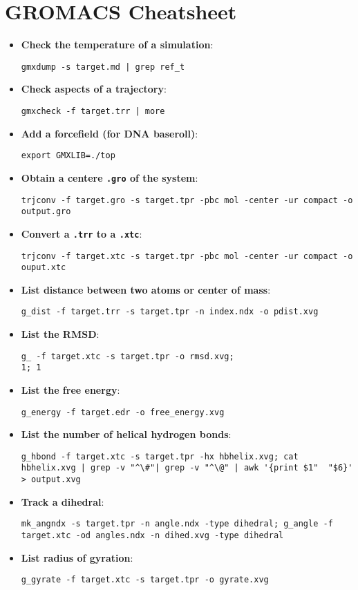 \documentclass[]{article}
\begin{document}
\newpage
\section*{GROMACS Cheatsheet}

\begin{itemize}
\item \textbf{Check the temperature of a simulation}: \begin{verbatim}gmxdump -s target.md | grep ref_t\end{verbatim}
\item \textbf{Check aspects of a trajectory}: \begin{verbatim}gmxcheck -f target.trr | more\end{verbatim}
\item \textbf{Add a forcefield (for DNA baseroll)}: \begin{verbatim}export GMXLIB=./top\end{verbatim}
\item \textbf{Obtain a centere \texttt{.gro} of the system}: \begin{verbatim}trjconv -f target.gro -s target.tpr -pbc mol -center -ur compact -o output.gro\end{verbatim}
\item \textbf{Convert a \texttt{.trr} to a \texttt{.xtc}}: \begin{verbatim}trjconv -f target.xtc -s target.tpr -pbc mol -center -ur compact -o ouput.xtc\end{verbatim}
\item \textbf{List distance between two atoms or center of mass}: \begin{verbatim}g_dist -f target.trr -s target.tpr -n index.ndx -o pdist.xvg\end{verbatim}
\item \textbf{List the RMSD}: \begin{verbatim}g_ -f target.xtc -s target.tpr -o rmsd.xvg;
1; 1\end{verbatim}
\item \textbf{List the free energy}: \begin{verbatim}g_energy -f target.edr -o free_energy.xvg\end{verbatim}
\item \textbf{List the number of helical hydrogen bonds}: \begin{verbatim}g_hbond -f target.xtc -s target.tpr -hx hbhelix.xvg; cat hbhelix.xvg | grep -v "^\#"| grep -v "^\@" | awk '{print $1"  "$6}' > output.xvg\end{verbatim}
\item \textbf{Track a dihedral}: \begin{verbatim}mk_angndx -s target.tpr -n angle.ndx -type dihedral; g_angle -f target.xtc -od angles.ndx -n dihed.xvg -type dihedral\end{verbatim}
\item \textbf{List radius of gyration}: \begin{verbatim}g_gyrate -f target.xtc -s target.tpr -o gyrate.xvg\end{verbatim}
\end{itemize}
\end{document}
